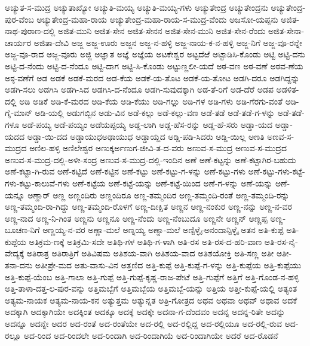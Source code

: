 ಅಚ್ಯುತ-ಸ-ಮುದ್ರ
ಅಚ್ಯುತಾಖ್ಯೋ
ಅಚ್ಯುತಿ-ಮಯ್ಯ
ಅಚ್ಯುತಿ-ಮಯ್ಯ-ಗಳು
ಅಚ್ಯುತೇಂದ್ರ
ಅಚ್ಯುತೇಂದ್ರನು
ಅಚ್ಯುತೇಂದ್ರ-ಪುರ-ವೆಂಬ
ಅಚ್ಯುತೇಂದ್ರ-ಮಹಾ-ರಾಯ
ಅಚ್ಯುತೇಂದ್ರ-ಮಹಾ-ರಾಯ-ಸ-ಮುದ್ರ-ವೆಂದು
ಅಜಸೋ-ಯಪ್ಪನು
ಅಜಿತ-ನಾಥ-ಪುರಾಣ-ದಲ್ಲಿ
ಅಜಿತ-ಮುನಿ
ಅಜಿತ-ಸೇನ
ಅಜಿತ-ಸೇನನ
ಅಜಿತ-ಸೇನ-ಮುನಿ
ಅಜಿತ-ಸೇನ-ರೆಂದು
ಅಜಿತ-ಸೇನಾ-ಚಾರ್ಯರ
ಅಜಿತಾ-ದೇವಿ
ಅಜ್ಜ
ಅಜ್ಜ-ಊರು
ಅಜ್ಜನ
ಅಜ್ಜ-ನ-ಹಳ್ಳಿ
ಅಜ್ಜ-ನಾಯ-ಕ-ನ-ಹಳ್ಳಿ
ಅಜ್ಜ-ನಿಗೆ
ಅಜ್ಜ-ವೂ-ರನ್ನೇ
ಅಜ್ಜ-ವೂ-ರಾದ
ಅಜ್ಜ-ವೂರು
ಅಜ್ಜಿ
ಅಜ್ಞಾತ
ಅಜ್ಞೆ
ಅಜ್ಞೆಯ
ಅಟಕೇಶ್ವರ
ಅಟ್ಟದೆಱೆ
ಅಟ್ಟಾಡಿಸಿ-ಕೊಂಡು
ಅಟ್ಟಿ
ಅಟ್ಟಿ-ದನು
ಅಟ್ಟಿ-ದ-ನೆಂದು
ಅಟ್ಟಿ-ದ-ನೆಂದೂ
ಅಟ್ಟಿ-ದಾಗ
ಅಟ್ಟಿ-ಸಿ-ಕೊಂಡು
ಅಟ್ಟುಣ್ಣಲೀ-ಯದೆ
ಅಠ-ವಣ
ಅಠ-ವಣೆ
ಅಠವ-ಣೆಯ
ಅಠ್ಠ-ವಣೆಗೆ
ಅಡ
ಅಡಕೆ
ಅಡಕೆ-ಮರದ
ಅಡ-ಕೆಯ
ಅಡಕೆ-ಯ-ತೊಟ
ಅಡಕೆ-ಯ-ತೋಟ
ಅಡಗಿ-ದರೂ
ಅಡಗಿದ್ದನ್ನು
ಅಡಗಿ-ಸಲು
ಅಡಗಿಸಿ
ಅಡಗಿ-ಸಿದ
ಅಡಗಿಸಿ-ದ-ನೆಂದೂ
ಅಡಗಿ-ಸುವುದಕ್ಕಾಗಿ
ಅಡ-ತೆ-ರಿಗೆ
ಅಡ-ದೆರೆ
ಅಡಪ
ಅಡಳಿತ-ದಲ್ಲಿ
ಅಡಿ
ಅಡಿಕೆ
ಅಡಿ-ಕೆ-ಮರದ
ಅಡಿ-ಕೆಯ
ಅಡಿ-ಕೆಯು
ಅಡಿ-ಗಲ್ಲು
ಅಡಿ-ಗಳ
ಅಡಿ-ಗಳು
ಅಡಿ-ಗೆರಗು-ವಂತೆ
ಅಡಿ-ಗೈ-ಮಾನ್
ಅಡಿ-ಯಲ್ಲಿ
ಅಡುಗಬ್ಬಿನ
ಅಡು-ವಿನ
ಅಡೆ-ಕಲ್ಲು
ಅಡೆ-ಕಲ್ಲು-ವಣ
ಅಡೆ-ತಡೆ
ಅಡೆ-ತಡೆ-ಗ-ಳನ್ನು
ಅಡೆ-ತಡೆ-ಗಳೂ
ಅಡೆ-ಪಯ್ಯ
ಅಡೆ-ಪಯ್ಯಂ
ಅಡೆಯಪ್ಪಯ್ಯ
ಅಡ್ಡ-ಲಾಗಿ
ಅಡ್ಡ-ಹೆಸ-ರನ್ನು
ಅಡ್ಡ-ಹೆ-ಸರು
ಅಡ್ಡಾ-ಯದ
ಅಡ್ಡಾ-ಯದದ
ಅಡ್ಡಾ-ಯಿ-ದದ
ಅಡ್ಡಾಯುಧಅಢಾಯುಧ
ಅಡ್ಡಾಯ್ದದ
ಅಡ್ಡಿ-ಪಡಿ-ಸಿದರು
ಅಡ್ಡಿ-ಯಿಲ್ಲ
ಅಣತಿ
ಅಣವ-ಸ-ಮುದ್ರದ
ಅಣಿಲ-ಹಳ್ಳಿ
ಅಣಿಲೇಶ್ವರ
ಅಣುಕ್ಕರ್ಅಣುಗ-ಜೀವಿ-ತ-ದ-ವರು
ಅಣುವ-ಸ-ಮುದ್ರ
ಅಣುವ-ಸ-ಮುದ್ರದ
ಅಣುವ-ಸ-ಮುದ್ರ-ದಲ್ಲಿ-ಅಳೀ-ಸಂದ್ರ
ಅಣುವ-ಸ-ಮುದ್ರ-ದಲ್ಲಿ-ಇಂದಿನ
ಅಣೆ
ಅಣೆ-ಕಟ್ಟನ್ನು
ಅಣೆ-ಕಟ್ಟಾಗಿರ-ಬಹುದು
ಅಣೆ-ಕಟ್ಟಾ-ಗಿ-ರುವ
ಅಣೆ-ಕಟ್ಟಿದೆ
ಅಣೆ-ಕಟ್ಟಿನ
ಅಣೆ-ಕಟ್ಟು
ಅಣೆ-ಕಟ್ಟು-ಗ-ಳನ್ನು
ಅಣೆ-ಕಟ್ಟು-ಗಳು
ಅಣೆ-ಕಟ್ಟು-ಗಳು-ಕಟ್ಟೆ-ಗಳು-ಕಟ್ಟು-ಕಾಲುವೆ-ಗಳು
ಅಣೆ-ಕಟ್ಟೆಯ
ಅಣೆ-ಕಟ್ಟೆ-ಯನ್ನು
ಅಣೆ-ಕಟ್ಟೆ-ಯಿಂದ
ಅಣೆ-ಗ-ಳನ್ನು
ಅಣೆ-ಯನ್ನು
ಅಣೆ-ಯನ್ನೂ
ಅಣ್ಡಾರ್
ಅಣ್ಣ
ಅಣ್ಣಂದಿರು
ಅಣ್ಣಂದಿರೂ
ಅಣ್ಣ-ತಮ್ಮಂದಿರ
ಅಣ್ಣ-ತಮ್ಮಂದಿ-ರಂತೆ
ಅಣ್ಣ-ತಮ್ಮಂದಿ-ರನ್ನು
ಅಣ್ಣ-ತಮ್ಮಂದಿ-ರಾ-ಗಿದ್ದು
ಅಣ್ಣ-ತಮ್ಮಂದಿ-ರೊಳಗೆ
ಅಣ್ಣ-ದೀಕ್ಷಿತ
ಅಣ್ಣನ
ಅಣ್ಣ-ನಂಕುರ
ಅಣ್ಣ-ನನ್ನು
ಅಣ್ಣ-ನ-ವರ
ಅಣ್ಣ-ನಾದ
ಅಣ್ಣ-ನಿ-ಗಿಂತ
ಅಣ್ಣನು
ಅಣ್ಣನೂ
ಅಣ್ಣ-ನೆಂದು
ಅಣ್ಣ-ನೆಂಬುದೂ
ಅಣ್ಣನೇ
ಅಣ್ಣನ್
ಅಣ್ಣಪ್ಪ
ಅಣ್ಣ-ಬೂಚಣ-ನಿಗೆ
ಅಣ್ಣಯ್ಯ-ನ-ವರ
ಅಣ್ಣಾ-ಮಲೆ
ಅಣ್ನಯ್ಯ
ಅಣ್ನಾ-ಮಲೆ
ಅಣ್ಪಿಳ್ಳೈ-ಅನಂದಾನ್ಪಿಳ್ಳೈ
ಅತನ
ಅತಿ-ಕುಪ್ಪೆ
ಅತಿ-ಕುಪ್ಪೆಯ
ಅತಿಕ್ರಮ-ಣಕ್ಕೆ
ಅತಿಕ್ರಮಿ-ಸದೇ
ಅತಿಥಿ-ಗಳ
ಅತಿಥಿ-ಗ-ಳಾಗಿ
ಅತಿ-ರಸ
ಅತಿ-ರಸ-ದ-ಹರಿ-ವಾಣ
ಅತಿ-ರಸ-ನೈ-ವೇದ್ಯಕ್ಕೆ
ಅತಿರಾತ್ರ
ಅತಿರಾತ್ರಿಗೆ
ಅತಿವಿಷಮ
ಅತಿಶಯ-ವಾಗಿ
ಅತಿಶಯ-ವಾದ
ಅತಿಶಯೋಕ್ತಿ
ಅತಿ-ಸಣ್ಣ
ಅತೀ
ಅತೀ-ತನಾ-ದನು
ಅತೀಪ್ರೇ-ಮದ
ಅತು-ವಾಸು-ವಿನ
ಅತ್ತಣಿದ
ಅತ್ತಿ-ಕುಪ್ಪೆ
ಅತ್ತಿ-ಕುಪ್ಪೆ-ಗ-ಳನ್ನು
ಅತ್ತಿ-ಕುಪ್ಪೆಯ
ಅತ್ತಿ-ಕುಪ್ಪೆಯು
ಅತ್ತಿ-ಕುಪ್ಪೆ-ಯೆಂಬ
ಅತ್ತಿ-ಗಾಲಾ
ಅತ್ತಿ-ಗುಪ್ಪೆ
ಅತ್ತಿ-ಗುಪ್ಪೆ-ಕೃಷ್ಣ-ರಾಜ-ಪೇಟೆ
ಅತ್ತಿ-ಗುಪ್ಪೆಗೆ
ಅತ್ತಿಗೆ
ಅತ್ತಿ-ಗೊಂಡ-ನ-ಹಳ್ಳಿ
ಅತ್ತಿ-ತಾಳಾ-ದತ್ತ-ಲ-ಪುರ-ವನ್ನು
ಅತ್ತಿಮಬ್ಬೆಗೆ
ಅತ್ತಿಮಬ್ಬೆಯ
ಅತ್ತಿಮಬ್ಬೆ-ಯನ್ನು
ಅತ್ತಿಯ
ಅತ್ತೀ-ಕುಪ್ಪೆ-ಯಲ್ಲಿ
ಅತ್ಯಂತ
ಅತ್ಯಮ-ನಾಯಕ
ಅತ್ಯಮ-ನಾಯ-ಕನ
ಅತ್ಯುತ್ತಮ
ಅತ್ಯುನ್ನತ
ಅತ್ರಿ-ಗೋತ್ರದ
ಅಥವ
ಅಥವಾ
ಅಥವ್
ಅಥಾವ
ಅದಕೆ
ಅದಕ್ಕಾಗಿ
ಅದಕ್ಕಾಗಿಯೇ
ಅದಕ್ಕಿಂತ
ಅದಕ್ಕೂ
ಅದಕ್ಕೆ
ಅದಕ್ಕೇ
ಅದನಾ-ಗ-ದೆಂದವಂ
ಅದನ್ನ
ಅದನ್ನ-ರಿತೇ
ಅದನ್ನು
ಅದನ್ನೂ
ಅದನ್ನೇ
ಅದರ
ಅದ-ರಂತೆ
ಅದ-ರಂತೆಯೇ
ಅದ-ರಲ್ಲಿ
ಅದ-ರಲ್ಲಿದ್ದ
ಅದ-ರಲ್ಲಿಯೂ
ಅದ-ರಲ್ಲಿ-ರುವ
ಅದ-ರಲ್ಲೂ
ಅದ-ರಿಂದ
ಅದ-ರಿಂದಲೇ
ಅದ-ರಿಂದಾಗಿ
ಅದ-ರಿಂದಾಗಿಯೆ
ಅದ-ರಿಂದಾಗಿಯೇ
ಅದರೆ
ಅದ-ರೊಡನೆ
